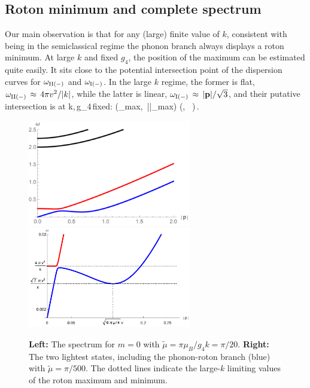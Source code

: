 \subsection{Roton minimum and complete spectrum}
Our main observation is that for any (large) finite value of $k$, consistent with being in the semiclassical regime the phonon branch always displays a roton minimum. 
At large $k$ and fixed $g_4$, the position of the maximum can be estimated quite easily. It sits close to the potential intersection point of the dispersion curves for $\omega_{\rm II(-)}$ and $\omega_{\rm I (-)}$. In the large $k$ regime, the former is flat, $\omega_{\rm II(-)}\,\approx\, 4\pi v^2/|k|$, while the latter is linear, $\omega_{\rm I(-)} \,\approx\, |{\bf p}|/\sqrt{3}$, and their putative intersection is at 
\be
k,\,g_4\,{\rm fixed}: \qquad \left(\rm \omega_{\rm max},\, |\p|_{\rm max}\right)\,\approx\,\left(, \, \right)\,.
\ee
\begin{figure}[h]
\begin{center}
\includegraphics[width=2.8in]{Chapter_3_Folder_1806.06976/figures/spectrumk20.pdf}\hspace{0.1in}\includegraphics[width=2.8in]{Chapter_3_Folder_1806.06976/figures/rotonk500.pdf}
\end{center}
\caption{ \small{{\bf Left:} The spectrum for $m=0$ with $\tilde\mu =\pi \mu_{B}/g_4 k =\pi/20 $. {\bf Right:} The two lightest states, including the phonon-roton branch (blue) with $\tilde\mu=\pi/500$. The dotted lines indicate the large-$k$ limiting values of the roton maximum and minimum.
}}
\label{largek}
\end{figure}
